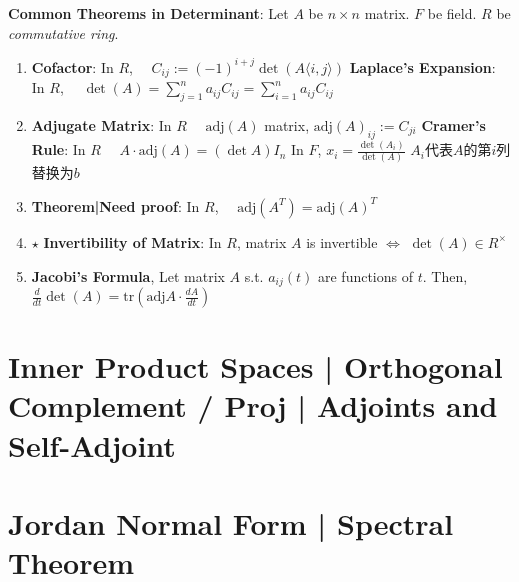 \documentclass[9pt]{article}
\begin{document}
\textbf{Common Theorems in Determinant}: Let $A$ be $n\times n$ matrix. \quad $F$ be field. \quad $R$ be \textit{commutative ring}.
\begin{enumerate}[itemsep=-2pt, topsep=-2pt]
    \item {\small \textbf{Cofactor}: In $R$, \ \ $C_{ij}:=(-1)^{i+j}\det(A\langle i,j\rangle)$  \quad \textbf{Laplace's Expansion}: In $R$, \ \ $\det(A)=\sum_{j=1}^n a_{ij}C_{ij}= \sum_{i=1}^n a_{ij}C_{ij}$}
    \item {\small \textbf{Adjugate Matrix}: In $R$ \ \ $\text{adj}(A)$ matrix, $\text{adj}(A)_{ij}:=C_{ji}$ \quad \textbf{Cramer's Rule}: In $R$ \ \ $A\cdot\text{adj}(A)=(\det A)I_n$ \quad In $F$, $x_i=\frac{\det(A_i)}{\det(A)}$ {\tiny $A_i$代表$A$的第$i$列替换为$b$}}
    \item \np \textbf{Theorem|Need proof}: In $R$, \ \ $\text{adj}(A^T)=\text{adj}(A)^T$ 
    \item $\star$ \textbf{Invertibility of Matrix}: In $R$, matrix $A$ is invertible $\Leftrightarrow$ $\det(A)\in R^\times$ 
    \item \textbf{Jacobi's Formula}, Let matrix $A$ s.t. $a_{ij}(t)$ are functions of $t$. \quad Then, $\frac{d}{dt}\det(A)=\text{tr}\left(\text{adj}A\cdot\frac{dA}{dt}\right)$
\end{enumerate}


\section{Inner Product Spaces | Orthogonal Complement / Proj | Adjoints and Self-Adjoint} %


\section{Jordan Normal Form | Spectral Theorem} %
\end{document}
